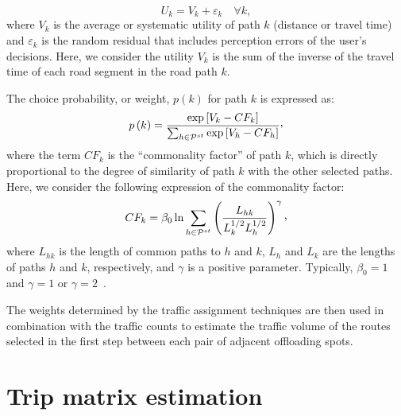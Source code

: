 \begin{equation}
U_k = V_k + \varepsilon_k\quad \forall k,
\end{equation}
where $V_k$ is the average or systematic utility of path $k$ (\eg distance or travel time) and $\varepsilon_k$ is the random residual that includes perception errors of the user’s decisions. Here, we consider the utility $V_k$ is the sum of the inverse of the travel time of each road segment in the road path $k$.

The choice probability, or weight, $p(k)$ for path $k$ is expressed as:
\begin{equation}
p\left(k\right)=\frac{\exp\left[V_{k}-CF_{k}\right]}{\sum_{h\in\mathcal{{P}}^{st}}\exp\left[V_{h}-CF_{h}\right]}\Comma
\end{equation}
where the term $CF_{k}$ is the ``commonality factor'' of path $k$, which is directly proportional to the degree of similarity of path $k$ with the other selected paths. Here, we consider the following expression of the commonality factor:
\begin{equation}
CF_{k}=\beta_{0}\ln\sum_{h\in\mathcal{P}^{st}}\left(\frac{L_{hk}}{L_{k}^{1/2}L_{h}^{1/2}}\right)^{\gamma}\Comma
\end{equation}
where $L_{hk}$ is the length of common paths to $h$ and $k$, $L_{h}$ and $L_{k}$ are the lengths of paths $h$ and $k$, respectively, and $\gamma$ is a positive parameter. Typically, $\beta_{0} = 1$ and $\gamma = 1$ or $\gamma = 2$~\cite{cascetta1996modified}.

The weights determined by the traffic assignment techniques are then used in combination with the traffic counts to estimate the traffic volume of the routes selected in the first step between each pair of adjacent offloading spots. 


\section{Trip matrix estimation}
\label{sec:trip-matrix-estimation}

